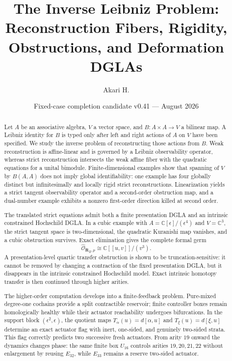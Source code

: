 \documentclass[11pt]{amsart}
\title[The Inverse Leibniz Problem]{The Inverse Leibniz Problem:\\Reconstruction Fibers, Rigidity, Obstructions, and Deformation DGLAs}
\author{Akari H.}
\date{Fixed-case completion candidate v0.41 --- August 2026}
\newcommand{\cO}{\mathcal O}
\newcommand{\C}{\mathbb C}
\begin{document}
\begin{abstract}
Let $A$ be an associative algebra, $V$ a vector space, and $B:A\times A\to V$ a bilinear map.  A Leibniz identity for $B$ is typed only after left and right actions of $A$ on $V$ have been specified.  We study the inverse problem of reconstructing those actions from $B$.  Weak reconstruction is affine-linear and is governed by a Leibniz observability operator, whereas strict reconstruction intersects the weak affine fiber with the quadratic equations for a unital bimodule.  Finite-dimensional examples show that spanning of $V$ by $B(A,A)$ does not imply global identifiability: one example has four globally distinct but infinitesimally and locally rigid strict reconstructions.  Linearization yields a strict tangent observability operator and a second-order obstruction map, and a dual-number example exhibits a nonzero first-order direction killed at second order.

The translated strict equations admit both a finite presentation DGLA and an intrinsic constrained Hochschild DGLA.  In a cubic example with $A=\C[\epsilon]/(\epsilon^4)$ and $V=\C^3$, the strict tangent space is two-dimensional, the quadratic Kuranishi map vanishes, and a cubic obstruction survives.  Exact elimination gives the complete formal germ
\[
\widehat{\cO}_{\mathbf R_B,p}\cong \C[[u,v]]/(v^3).
\]
A presentation-level quartic transfer obstruction is shown to be truncation-sensitive: it cannot be removed by changing a contraction of the fixed presentation DGLA, but it disappears in the intrinsic constrained Hochschild model.  Exact intrinsic homotopy transfer is then continued through higher arities.

The higher-order computation develops into a finite-feedback problem.  Pure-mixed degree-one cochains provide a split contractible reservoir; finite controller boxes remain homologically healthy while their actuator reachability undergoes bifurcations.  In the support block $(\epsilon^2,\epsilon)$, the quotient maps $T_\alpha(u)=d[\alpha,u]$ and $T_\xi(u)=d[\xi,u]$ determine an exact actuator flag with inert, one-sided, and genuinely two-sided strata.  This flag correctly predicts two successive fresh actuators.  From arity $19$ onward the dynamics changes phase: the same finite box $U_{16}$ controls arities $19,20,21,22$ without enlargement by reusing $E_{32}$, while $E_{33}$ remains a reserve two-sided actuator.


\end{abstract}
\end{document}
